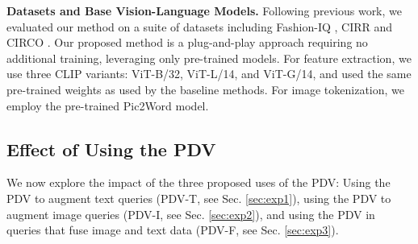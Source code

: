 \noindent\textbf{Datasets and Base Vision-Language Models.} Following previous work, we evaluated our method on a suite of datasets including Fashion-IQ \cite{wu2021fashion}, CIRR \cite{liu2021image} and CIRCO \cite{baldrati2023zero}. Our proposed method is a plug-and-play approach requiring no additional training, leveraging only pre-trained models. For feature extraction, we use three CLIP variants: ViT-B/32, ViT-L/14, and ViT-G/14, and used the same pre-trained weights as used by the baseline methods. For image tokenization, we employ the pre-trained Pic2Word model. 

\subsection{Effect of Using the PDV}
We now explore the impact of the three proposed uses of the PDV: Using the PDV to augment text queries (PDV-T, see Sec. \ref{sec:exp1}), using the PDV to augment image queries (PDV-I, see Sec. \ref{sec:exp2}), and using the PDV in queries that fuse image and text data (PDV-F, see Sec. \ref{sec:exp3}).

